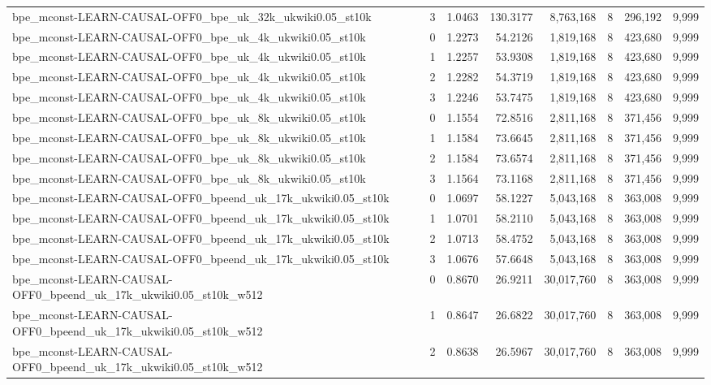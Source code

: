 \begin{tabular}{lrrrrrrr}
bpe\_mconst-LEARN-CAUSAL-OFF0\_bpe\_uk\_32k\_ukwiki0.05\_st10k & 3 & 1.0463 & 130.3177 & 8,763,168 & 8 & 296,192 & 9,999 \\
bpe\_mconst-LEARN-CAUSAL-OFF0\_bpe\_uk\_4k\_ukwiki0.05\_st10k & 0 & 1.2273 & 54.2126 & 1,819,168 & 8 & 423,680 & 9,999 \\
bpe\_mconst-LEARN-CAUSAL-OFF0\_bpe\_uk\_4k\_ukwiki0.05\_st10k & 1 & 1.2257 & 53.9308 & 1,819,168 & 8 & 423,680 & 9,999 \\
bpe\_mconst-LEARN-CAUSAL-OFF0\_bpe\_uk\_4k\_ukwiki0.05\_st10k & 2 & 1.2282 & 54.3719 & 1,819,168 & 8 & 423,680 & 9,999 \\
bpe\_mconst-LEARN-CAUSAL-OFF0\_bpe\_uk\_4k\_ukwiki0.05\_st10k & 3 & 1.2246 & 53.7475 & 1,819,168 & 8 & 423,680 & 9,999 \\
bpe\_mconst-LEARN-CAUSAL-OFF0\_bpe\_uk\_8k\_ukwiki0.05\_st10k & 0 & 1.1554 & 72.8516 & 2,811,168 & 8 & 371,456 & 9,999 \\
bpe\_mconst-LEARN-CAUSAL-OFF0\_bpe\_uk\_8k\_ukwiki0.05\_st10k & 1 & 1.1584 & 73.6645 & 2,811,168 & 8 & 371,456 & 9,999 \\
bpe\_mconst-LEARN-CAUSAL-OFF0\_bpe\_uk\_8k\_ukwiki0.05\_st10k & 2 & 1.1584 & 73.6574 & 2,811,168 & 8 & 371,456 & 9,999 \\
bpe\_mconst-LEARN-CAUSAL-OFF0\_bpe\_uk\_8k\_ukwiki0.05\_st10k & 3 & 1.1564 & 73.1168 & 2,811,168 & 8 & 371,456 & 9,999 \\
bpe\_mconst-LEARN-CAUSAL-OFF0\_bpeend\_uk\_17k\_ukwiki0.05\_st10k & 0 & 1.0697 & 58.1227 & 5,043,168 & 8 & 363,008 & 9,999 \\
bpe\_mconst-LEARN-CAUSAL-OFF0\_bpeend\_uk\_17k\_ukwiki0.05\_st10k & 1 & 1.0701 & 58.2110 & 5,043,168 & 8 & 363,008 & 9,999 \\
bpe\_mconst-LEARN-CAUSAL-OFF0\_bpeend\_uk\_17k\_ukwiki0.05\_st10k & 2 & 1.0713 & 58.4752 & 5,043,168 & 8 & 363,008 & 9,999 \\
bpe\_mconst-LEARN-CAUSAL-OFF0\_bpeend\_uk\_17k\_ukwiki0.05\_st10k & 3 & 1.0676 & 57.6648 & 5,043,168 & 8 & 363,008 & 9,999 \\
bpe\_mconst-LEARN-CAUSAL-OFF0\_bpeend\_uk\_17k\_ukwiki0.05\_st10k\_w512 & 0 & 0.8670 & 26.9211 & 30,017,760 & 8 & 363,008 & 9,999 \\
bpe\_mconst-LEARN-CAUSAL-OFF0\_bpeend\_uk\_17k\_ukwiki0.05\_st10k\_w512 & 1 & 0.8647 & 26.6822 & 30,017,760 & 8 & 363,008 & 9,999 \\
bpe\_mconst-LEARN-CAUSAL-OFF0\_bpeend\_uk\_17k\_ukwiki0.05\_st10k\_w512 & 2 & 0.8638 & 26.5967 & 30,017,760 & 8 & 363,008 & 9,999 \\

\end{tabular}
